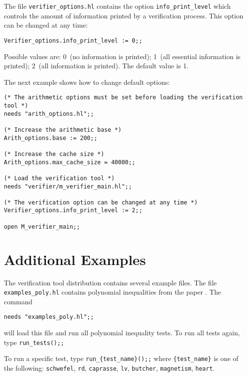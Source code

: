 \documentclass[a4paper]{article}
\begin{document}
The file \verb|verifier_options.hl| contains the option \verb|info_print_level| which controls the amount of information printed by a verification process. This option can be changed at any time:

\verb|Verifier_options.info_print_level := 0;;|

Possible values are: 0~(no information is printed); 1~(all essential information is printed); 2~(all information is printed). The default value is 1.

The next example shows how to change default options:
\begin{verbatim}
(* The arithmetic options must be set before loading the verification tool *)
needs "arith_options.hl";;

(* Increase the arithmetic base *)
Arith_options.base := 200;;

(* Increase the cache size *)
Arith_options.max_cache_size = 40000;;

(* Load the verification tool *)
needs "verifier/m_verifier_main.hl";;

(* The verification option can be changed at any time *)
Verifier_options.info_print_level := 2;;

open M_verifier_main;;
\end{verbatim}

\section{Additional Examples}
The verification tool distribution contains several example files. The file \verb|examples_poly.hl| contains polynomial inequalities from the paper \cite{bernstein}. The command

\verb|needs "examples_poly.hl";;|

will load this file and run all polynomial inequality tests. To run all tests again, type \verb|run_tests();;|

To run a specific test, type \verb|run_{test_name}();;| where \verb|{test_name}| is one of the following: \verb|schwefel|, \verb|rd|, \verb|caprasse|, \verb|lv|, \verb|butcher|, \verb|magnetism|, \verb|heart|.
\end{document}
